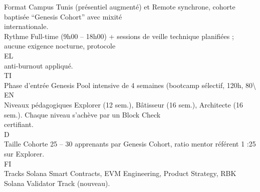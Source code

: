 \documentclass[12pt,landscape,a4paper]{article}
\begin{document}
\vspace{0.5em}
Format                      Campus Tunis (présentiel augmenté) et Remote synchrone, cohorte baptisée “Genesis Cohort” avec mixité\\
internationale.\\
\vspace{0.5em}
Rythme                      Full-time (9h00 – 18h00) + sessions de veille technique planifiées ; aucune exigence nocturne, protocole\\
\vspace{0.5em}
\vspace{0.5em}
\vspace{0.5em}
\vspace{0.5em}
EL\\
anti-burnout appliqué.\\
\vspace{0.5em}
\vspace{0.5em}
\vspace{0.5em}
\vspace{0.5em}
TI\\
Phase d’entrée              Genesis Pool intensive de 4 semaines (bootcamp sélectif, 120h, 80\textbackslash{}%
\vspace{0.5em}
\vspace{0.5em}
\vspace{0.5em}
\vspace{0.5em}
EN\\
Niveaux pédagogiques        Explorer (12 sem.), Bâtisseur (16 sem.), Architecte (16 sem.). Chaque niveau s’achève par un Block Check\\
certifiant.\\
\vspace{0.5em}
\vspace{0.5em}
\vspace{0.5em}
\vspace{0.5em}
D\\
Taille Cohorte              25 – 30 apprenants par Genesis Cohort, ratio mentor référent 1 :25 sur Explorer.\\
\vspace{0.5em}
\vspace{0.5em}
\vspace{0.5em}
\vspace{0.5em}
FI\\
Tracks                      Solana Smart Contracts, EVM Engineering, Product Strategy, RBK Solana Validator Track (nouveau).\\
\end{document}
